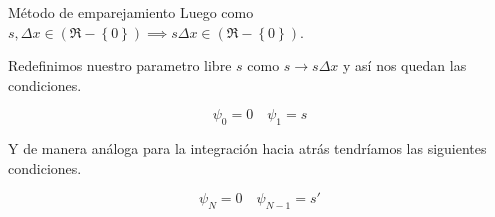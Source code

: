 \begin{frame}{Método de emparejamiento}
    Luego como $s,\Delta x \in \left( \Re - \left\{ 0 \right\} \right) \implies s \Delta x \in \left( \Re - \left\{ 0 \right\} \right) $.

    \vspace{0.2cm}

    Redefinimos nuestro parametro libre $s$ como $s \longrightarrow s\Delta x$ y así nos quedan las condiciones.

    \begin{equation}
        \psi_0 = 0 \quad \psi_1 = s
    \end{equation}
    
    \vspace{0.2cm}
    
    Y de manera análoga para la integración hacia atrás tendríamos las siguientes condiciones.

    \begin{equation}
        \psi_N = 0 \quad \psi_{N-1} = s'
    \end{equation}
    

\end{frame}